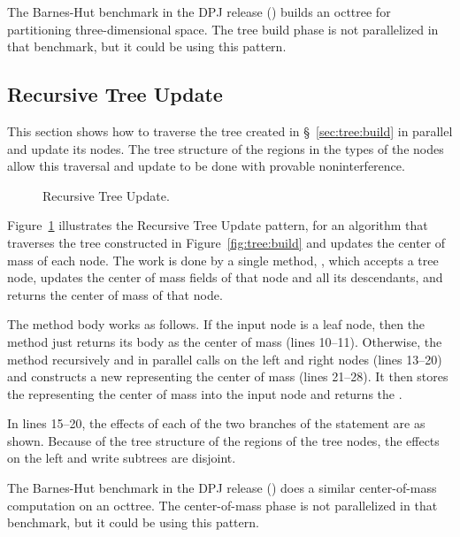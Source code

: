 The Barnes-Hut benchmark in the DPJ release
() builds an octtree for
partitioning three-dimensional space.  The tree build phase is not
parallelized in that benchmark, but it could be using this pattern.

\subsection{Recursive Tree Update%
\label{sec:tree:update}}

This section shows how to traverse the tree created in
\S~\ref{sec:tree:build} in parallel and update its nodes.  The tree
structure of the regions in the types of the nodes allow this
traversal and update to be done with provable noninterference.

\begin{figure}

\caption{Recursive Tree Update.}
\label{fig:tree:update}
\end{figure}

 Figure~\ref{fig:tree:update}
illustrates the Recursive Tree Update pattern, for an algorithm that
traverses the tree constructed in Figure~\ref{fig:tree:build} and
updates the center of mass of each node.  The work is done by a single
method, , which accepts a tree node, updates
the center of mass fields of that node and all its descendants, and
returns the center of mass of that node.

The method body works as follows.  If the input node is a leaf node,
then the method just returns its body as the center of mass (lines
10--11).  Otherwise, the method recursively and in parallel calls
 on the left and right nodes (lines 13--20)
and constructs a new  representing the center of mass (lines
21--28).  It then stores the  representing the center of
mass into the input node and returns the .

In lines 15--20, the effects of each of the two branches of the
 statement are as shown.  Because of the tree structure
of the regions of the tree nodes, the effects on the left and write
subtrees are disjoint.

 The Barnes-Hut benchmark in the DPJ release
() does a similar
center-of-mass computation on an octtree.  The center-of-mass phase is
not parallelized in that benchmark, but it could be using this
pattern.


